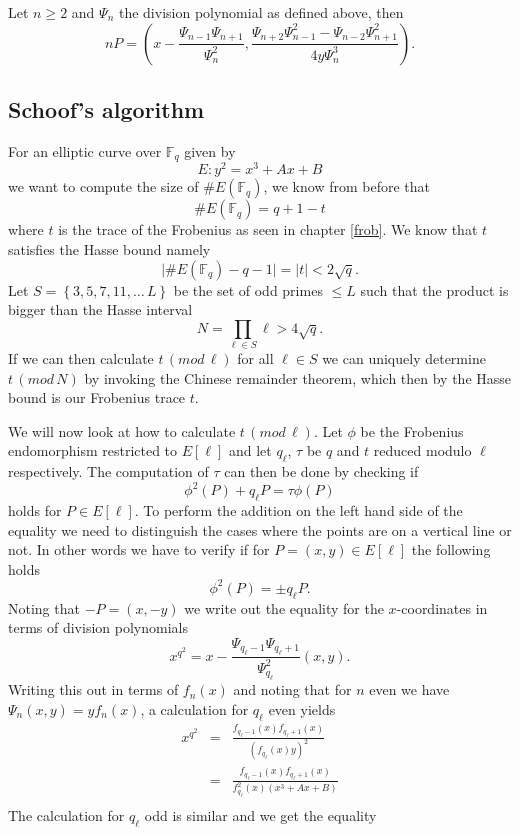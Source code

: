 \begin{prop}
 Let $n \geq 2$ and $\Psi_n$ the division polynomial as defined above, then
$$ nP = (x - \frac{\Psi_{n-1} \Psi_{n+1}}{\Psi_n^2}, \frac{\Psi_{n+2} \Psi_{n-1}^2 - \Psi_{n-2} \Psi_{n+1}^2}{4y \Psi_n^3} ).$$
\end{prop}

\subsection{Schoof's algorithm}
For an elliptic curve over $\mathbb{F}_q$ given by
$$ E: y^2 = x^3 + Ax + B $$
we want to compute the size of $\#E(\mathbb{F}_q)$, we know from before that
$$ \#E(\mathbb{F}_q) = q + 1 - t $$
where $t$ is the trace of the Frobenius as seen in chapter \ref{frob}. We know
that $t$ satisfies the Hasse bound namely
$$ \lvert \#E(\mathbb{F}_q)-q-1\rvert=\lvert t\rvert < 2\sqrt{q}.$$
Let $S = \left\{3, 5, 7, 11, \ldots \, L \right\}$ be the set of odd primes $\leq L$ such
that the product is bigger than the Hasse interval
$$ N = \prod_{\ell \in S} \ell  > 4\sqrt{q}. $$
If we can then calculate $t\, (mod\,\ell)$ for all $\ell \in S$ we can uniquely
determine $t\,(mod\,N)$ by invoking the Chinese remainder theorem,
which then by the Hasse bound is our Frobenius trace $t$.

We will now look at
how to calculate $t\, (mod\,\ell)$. Let $\phi$ be the Frobenius endomorphism
restricted to $E[\ell]$ and let $q_\ell$, $\tau$ be $q$ and $t$ reduced modulo $\ell$
respectively. The computation of $\tau$ can then be done by checking if
$$ \phi^2(P) + q_\ell P = \tau \phi(P) $$
holds for $P \in E[\ell]$. To perform the addition on the left hand side of the
equality we need to distinguish the cases where the points are on a vertical line or not.
In other words we have to verify if for $P = (x,y) \in E[\ell]$ the following holds
$$ \phi^2 (P) = \pm q_\ell P. $$
Noting that $-P = (x, -y)$ we write out the equality for the $x$-coordinates in terms of
division polynomials
$$ x^{q^2} = x - \frac{\Psi_{q_\ell-1} \Psi_{q_\ell+1}}{\Psi_{q_\ell}^2}(x,y). $$
Writing this out in terms of $f_n(x)$ and noting that for $n$ even we have
$\Psi_n(x,y) = y f_n(x)$, a calculation for $q_\ell$ even yields
\begin{eqnarray*}
 x^{q^2} &=& \frac{f_{q_\ell-1}(x) f_{q_\ell+1}(x)}{(f_{q_\ell}(x) y)^2} \nonumber \\
	 &=& \frac{f_{q_\ell-1}(x) f_{q_\ell+1}(x)}{f_{q_\ell}^2(x) (x^3+Ax+B)} \nonumber \\
\end{eqnarray*}
The calculation for $q_\ell$ odd is similar and we get the equality

